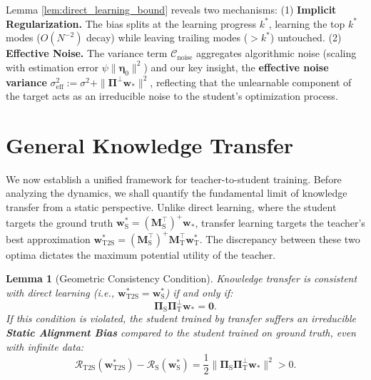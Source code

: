 \documentclass{article}
\theoremstyle{definition}
\theoremstyle{definition}
\theoremstyle{plain}
\theoremstyle{plain}
\theoremstyle{plain}
\newtheorem{lemma}{Lemma}
\theoremstyle{plain}
\theoremstyle{plain}
\newcommand{\bs}[1]{\boldsymbol{\mathbf{#1}}}
\newcommand{\te}{\mathrm{T}}
\newcommand{\st}{\mathrm{S}}
\newcommand{\ts}{\mathrm{T2S}}
\newcommand{\eff}{\mathrm{eff}}
\newcommand{\M}{\mathbf{M}}
\newcommand{\w}{\mathbf{w}}
\begin{document}
Lemma \ref{lem:direct_learning_bound} reveals two mechanisms:
(1) \textbf{Implicit Regularization.} The bias splits at the learning progress $k^*$, learning the top $k^*$ modes ($O(N^{-2})$ decay) while leaving trailing modes ($>k^*$) untouched.
(2) \textbf{Effective Noise.} The variance term $\mathcal{C}_{\text{noise}}$ aggregates algorithmic noise (scaling with estimation error $\psi\|\bs\eta_0\|^2$) and our key insight, the \textbf{effective noise variance} $\sigma_{\eff}^2 := \sigma^2 + \|\mathbf{\Pi}^\perp \w_*\|^2$, reflecting that the unlearnable component of the target acts as an irreducible noise to the student’s optimization process. 

\section{General Knowledge Transfer}
\label{sec:knowledge_transfer}

We now establish a unified framework for teacher-to-student training. Before analyzing the dynamics, we shall quantify the fundamental limit of knowledge transfer from a static perspective. 
Unlike direct learning, where the student targets the ground truth $\mathbf{w}_\st^* = (\M_\st^\top)^+ \mathbf{w}_*$, transfer learning targets the teacher's best approximation $\mathbf{w}_\ts^* = (\M_\st^\top)^+\M_\te^\top \mathbf{w}_\te^*$. The discrepancy between these two optima dictates the maximum potential utility of the teacher.

\begin{lemma}[Geometric Consistency Condition]
\label{lem:geometric_consistency}
    Knowledge transfer is consistent with direct learning (i.e., $\mathbf{w}_\ts^* = \mathbf{w}_\st^*$) if and only if:
    \begin{equation}
        \mathbf{\Pi}_\st \mathbf{\Pi}_\te^\perp \mathbf{w}_* = \mathbf{0}.
    \end{equation}
    If this condition is violated, the student trained by transfer suffers an irreducible \textbf{Static Alignment Bias} compared to the student trained on ground truth, even with infinite data:
    \vspace{-0.3cm}
    \begin{equation}
        \mathcal{R}_{\ts}(\mathbf{w}_\ts^*) - \mathcal{R}_{\st}(\mathbf{w}_\st^*) = \frac{1}{2} \| \mathbf{\Pi}_\st \mathbf{\Pi}_\te^\perp \mathbf{w}_* \|^2 > 0.
    \end{equation}
\end{lemma}
\end{document}

